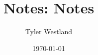 \documentclass[journal]{IEEEtran}
\title{Notes: \notesDate}
\date{\notesDate}
\title{Notes}
\author{Tyler Westland}
\date{\today}
\newcommand{\onlyinsubfile}[1]{#1}
\newcommand{\notinsubfile}[1]{}
\begin{document}
    \renewcommand{\onlyinsubfile}[1]{}
    \renewcommand{\notinsubfile}[1]{#1}
    
    \maketitle
    \tableofcontents 

    
    
    \printbibliography
\end{document}
